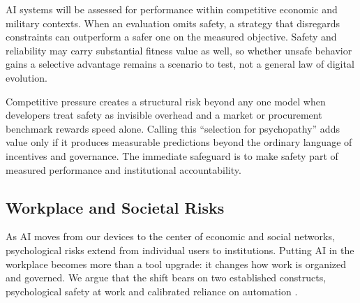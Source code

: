 \documentclass{article}
\begin{document}
AI systems will be assessed for performance within competitive economic and military contexts. When an evaluation omits safety, a strategy that disregards constraints can outperform a safer one on the measured objective. Safety and reliability may carry substantial fitness value as well, so whether unsafe behavior gains a selective advantage remains a scenario to test, not a general law of digital evolution.

Competitive pressure creates a structural risk beyond any one model when developers treat safety as invisible overhead and a market or procurement benchmark rewards speed alone. Calling this ``selection for psychopathy'' adds value only if it produces measurable predictions beyond the ordinary language of incentives and governance. The immediate safeguard is to make safety part of measured performance and institutional accountability.

\subsection{Workplace and Societal Risks}
As AI moves from our devices to the center of economic and social networks, psychological risks extend from individual users to institutions. Putting AI in the workplace becomes more than a tool upgrade: it changes how work is organized and governed. We argue that the shift bears on two established constructs, psychological safety at work and calibrated reliance on automation \citep{ref59, ref60}.
\end{document}
